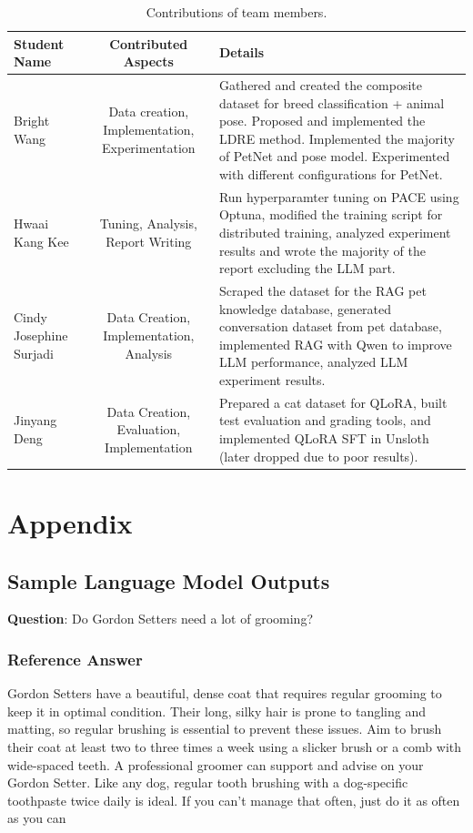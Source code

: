 \documentclass[10pt,twocolumn,letterpaper]{article}
\begin{document}

\clearpage
\begin{table}[t]
\begin{center}
\begin{tabular}{|l|c|p{8cm}|}
\hline
Student Name & Contributed Aspects & Details \\
\hline\hline
Bright Wang & Data creation, Implementation, Experimentation & Gathered and created the composite dataset for breed classification + animal pose. Proposed and implemented the LDRE method. Implemented the majority of PetNet and pose model. Experimented with different configurations for PetNet.\\
Hwaai Kang Kee & Tuning, Analysis, Report Writing & Run hyperparamter tuning on PACE using Optuna, modified the training script for distributed training, analyzed experiment results and wrote the majority of the report excluding the LLM part. \\
Cindy Josephine Surjadi & Data Creation, Implementation, Analysis & Scraped the dataset for the RAG pet knowledge database, generated conversation dataset from pet database, implemented RAG with Qwen to improve LLM performance, analyzed LLM experiment results. \\
Jinyang Deng & Data Creation, Evaluation, Implementation & Prepared a cat dataset for QLoRA, built test evaluation and grading tools, and implemented QLoRA SFT in Unsloth (later dropped due to poor results).\\
\hline
\end{tabular}
\end{center}
\caption{Contributions of team members.}
\label{tab:contributions}
\end{table}


{\small


}

\clearpage
\section{Appendix}
\subsection{Sample Language Model Outputs}
\textbf{Question}: Do Gordon Setters need a lot of grooming?

\subsubsection{Reference Answer}
Gordon Setters have a beautiful, dense coat that requires regular grooming to keep it in optimal condition. Their long, silky hair is prone to tangling and matting, so regular brushing is essential to prevent these issues. Aim to brush their coat at least two to three times a week using a slicker brush or a comb with wide-spaced teeth. A professional groomer can support and advise on your Gordon Setter. Like any dog, regular tooth brushing with a dog-specific toothpaste twice daily is ideal. If you can’t manage that often, just do it as often as you can
\end{document}
